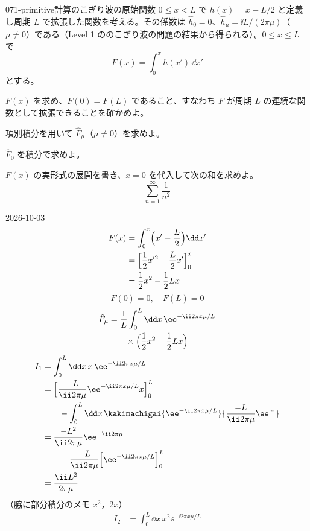 \documentclass[uplatex,dvipdfmx,a4paper,11pt]{jsarticle}
\begin{document}
\begin{mondai}{071-primitive}{計算}{のこぎり波の原始関数}
$0\le x<L$ で $h(x)=x-L/2$ と定義し周期 $L$ で拡張した関数を考える。その係数は $\hat{h}_0=0$、$\hat{h}_{\mu}=\ii L/(2\pi\mu)$（$\mu\neq0$）である（Level 1 ののこぎり波の問題の結果から得られる）。$0\le x\le L$ で
\[
F(x)=\int_{0}^{x}h(x')\,\dd x'
\]
とする。
\begin{shoumon}
  \item $F(x)$ を求め、$F(0)=F(L)$ であること、すなわち $F$ が周期 $L$ の連続な関数として拡張できることを確かめよ。
  \item 項別積分を用いて $\hat{F}_{\mu}$（$\mu\neq0$）を求めよ。
  \item $\hat{F}_0$ を積分で求めよ。
  \item $F(x)$ の実形式の展開を書き、$x=0$ を代入して次の和を求めよ。
\[
\sum_{n=1}^{\infty}\frac{1}{n^{2}}
\]
\end{shoumon}
\begin{kotaeutsushi}{2026-10-03}
\begin{align*}
  F(x)&=\int_{0}^{x}\Bigl(x'-\frac{L}{2}\Bigr)\dd x'\\
  &=\Bigl[\frac{1}{2}x'^{2}-\frac{L}{2}x'\Bigr]_{0}^{x}\\
  &=\frac{1}{2}x^{2}-\frac{1}{2}Lx
\end{align*}
\[ F(0)=0,\quad F(L)=0 \]
\begin{align*}
  \hat{F}_{\mu}&=\frac{1}{L}\int_{0}^{L}\dd x\,\ee^{-\ii2\pi x\mu/L}\\
  &\qquad\times\Bigl(\frac{1}{2}x^{2}-\frac{1}{2}Lx\Bigr)
\end{align*}
\begin{align*}
  I_1&=\int_{0}^{L}\dd x\,x\,\ee^{-\ii2\pi x\mu/L}\\
  &=\Bigl[\frac{-L}{\ii2\pi\mu}\ee^{-\ii2\pi x\mu/L}x\Bigr]_{0}^{L}\\
  &\qquad-\int_{0}^{L}\dd x\,\kakimachigai{\ee^{-\ii2\pi x\mu/L}}{\frac{-L}{\ii2\pi\mu}\ee^{\cdots}}\\
  &=\frac{-L^{2}}{\ii2\pi\mu}\ee^{-\ii2\pi\mu}\\
  &\qquad-\frac{-L}{\ii2\pi\mu}\Bigl[\ee^{-\ii2\pi x\mu/L}\Bigr]_{0}^{L}\\
  &=\frac{\ii L^{2}}{2\pi\mu}
\end{align*}
（脇に部分積分のメモ $x^{2}$，$2x$）
\begin{align*}
  I_2&=\int_{0}^{L}\dd x\,x^{2}\ee^{-\ii2\pi x\mu/L}\\

\end{align*}
\end{kotaeutsushi}
\end{mondai}
\end{document}
